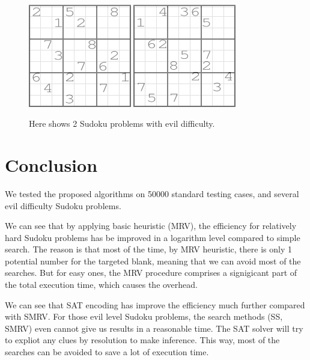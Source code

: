 \documentclass[11pt]{article}
\begin{document}
\begin{figure}
\begin{center}
\includegraphics[width=0.4\textwidth]{fig/evil1.png}
\includegraphics[width=0.4\textwidth]{fig/evil2.png}
\end{center}

\caption{Here shows 2 Sudoku problems with evil difficulty.}
\label{evil}
\end{figure}

\section {Conclusion}
We tested the proposed algorithms on 50000 standard testing cases, and several evil difficulty Sudoku problems.

We can see that by applying basic heuristic (MRV), the efficiency for relatively hard Sudoku problems has be improved in a logarithm level compared to simple search. The reason is that most of the time, by MRV heuristic, there is only 1 potential number for the targeted blank, meaning that we can avoid most of the searches. But for easy ones, the MRV procedure comprises a signigicant part of the total execution time, which causes the overhead.

We can see that SAT encoding has improve the efficiency much further compared with SMRV. For those evil level Sudoku problems, the search methods (SS, SMRV) even cannot give us results in a reasonable time. The SAT solver will try to expliot any clues by resolution to make inference. This way, most of the searches can be avoided to save a lot of execution time.
\end{document}
